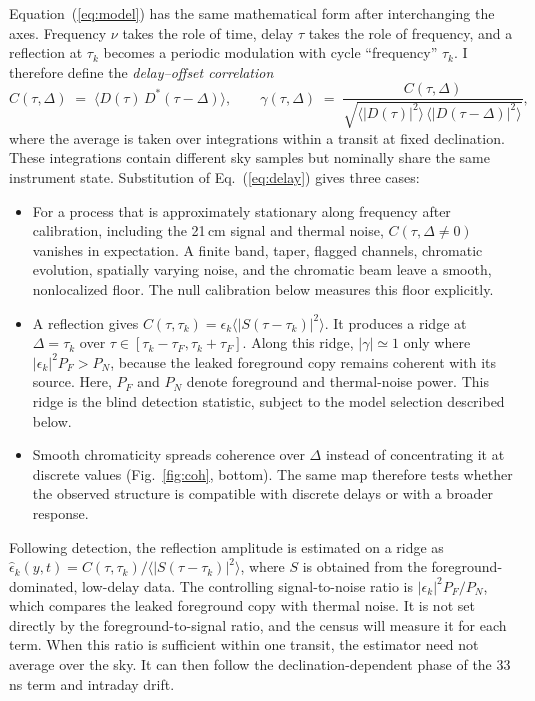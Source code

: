 \documentclass[12pt]{article}
\begin{document}
Equation~(\ref{eq:model}) has the same mathematical form after interchanging the axes. Frequency $\nu$ takes the role of time, delay $\tau$ takes the role of frequency, and a reflection at $\tau_k$ becomes a periodic modulation with cycle ``frequency'' $\tau_k$. I therefore define the \emph{delay--offset correlation}
\begin{equation}
C(\tau, \Delta) \;=\; \big\langle D(\tau)\, D^{*}(\tau-\Delta) \big\rangle, \qquad
\gamma(\tau,\Delta) \;=\; \frac{C(\tau,\Delta)}{\sqrt{\langle |D(\tau)|^2\rangle\, \langle |D(\tau-\Delta)|^2\rangle}},
\label{eq:coh}
\end{equation}
where the average is taken over integrations within a transit at fixed declination. These integrations contain different sky samples but nominally share the same instrument state. Substitution of Eq.~(\ref{eq:delay}) gives three cases:
\begin{itemize}
\item For a process that is approximately stationary along frequency after calibration, including the 21\,cm signal and thermal noise, $C(\tau,\Delta\ne0)$ vanishes in expectation. A finite band, taper, flagged channels, chromatic evolution, spatially varying noise, and the chromatic beam leave a smooth, nonlocalized floor. The null calibration below measures this floor explicitly.
\item A reflection gives $C(\tau,\tau_k)=\epsilon_k\langle|S(\tau-\tau_k)|^2\rangle$. It produces a ridge at $\Delta=\tau_k$ over $\tau\in[\tau_k-\tau_F,\tau_k+\tau_F]$. Along this ridge, $|\gamma|\simeq1$ only where $|\epsilon_k|^2P_F>P_N$, because the leaked foreground copy remains coherent with its source. Here, $P_F$ and $P_N$ denote foreground and thermal-noise power. This ridge is the blind detection statistic, subject to the model selection described below.
\item Smooth chromaticity spreads coherence over $\Delta$ instead of concentrating it at discrete values (Fig.~\ref{fig:coh}, bottom). The same map therefore tests whether the observed structure is compatible with discrete delays or with a broader response.
\end{itemize}
Following detection, the reflection amplitude is estimated on a ridge as $\hat\epsilon_k(y,t)=C(\tau,\tau_k)/\langle|S(\tau-\tau_k)|^2\rangle$, where $S$ is obtained from the foreground-dominated, low-delay data. The controlling signal-to-noise ratio is $|\epsilon_k|^2P_F/P_N$, which compares the leaked foreground copy with thermal noise. It is not set directly by the foreground-to-signal ratio, and the census will measure it for each term. When this ratio is sufficient within one transit, the estimator need not average over the sky. It can then follow the declination-dependent phase of the 33\,ns term and intraday drift.
\end{document}
